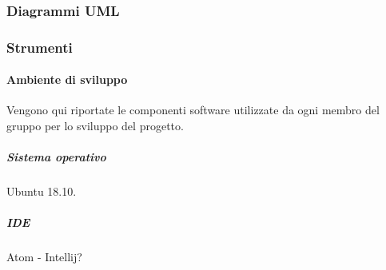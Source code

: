         




		\subsubsection{Diagrammi UML}\label{PP:Sviluppo:UML}	
		
		

        
        \subsubsection{Strumenti}\label{PP:Sviluppo:Strumenti}
        
	    \paragraph{Ambiente di sviluppo}\label{PP:Sviluppo:Strumenti:AmbienteSviluppo}
	    Vengono qui riportate le componenti software utilizzate da ogni membro del gruppo per lo sviluppo del progetto.
	         	
	        	
	    \subparagraph{Sistema operativo}\label{PP:Sviluppo:Strumenti:AmbienteSviluppo:SistemaOperativo}
	    
	    Ubuntu 18.10.
	        		
	    \subparagraph{IDE}\label{PP:Sviluppo:Strumenti:AmbienteSviluppo:IDE}
	    Atom - Intellij?
        
		
		
	